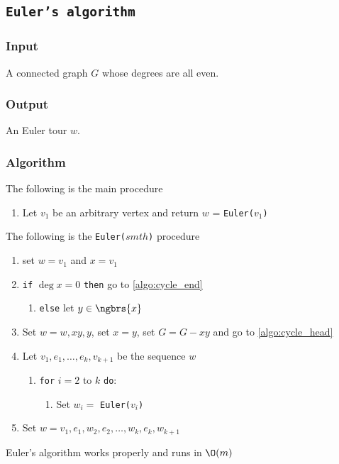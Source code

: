 \subsection{\texttt{Euler's algorithm}}
\subsubsection{Input}
    A connected graph $G$ whose degrees are all even.
\subsubsection{Output}
    An Euler tour $w$.
\subsubsection{Algorithm}
The following is the main procedure
\begin{enumerate}
    \item Let $v_1$ be an arbitrary vertex and return $w$ = \texttt{Euler($v_1$)}
\end{enumerate}
The following is the \texttt{Euler($smth$)} procedure
\begin{enumerate}
    \item set $w = v_1$ and $x = v_1$
    \item \label{algo:cycle_head} \texttt{if} $\deg{x} = 0$ \texttt{then} go to \ref{algo:cycle_end}
    \begin{enumerate}
        \item \texttt{else} let $y \in \ngbrs{x}$
    \end{enumerate}
    \item Set $w = w, xy, y$, set $x = y$, set $G = G - xy$ and go to \ref{algo:cycle_head}
    \item \label{algo:cycle_end} Let $v_1, e_1, \dots, e_k, v_{k + 1}$ be the sequence $w$
    \begin{enumerate}
        \item \texttt{for} $i = 2$ to $k$ \texttt{do}:
        \begin{enumerate}
            \item Set $w_i =$ \texttt{Euler($v_i$)}
        \end{enumerate}
    \end{enumerate}
    \item Set $w = v_1, e_1, w_2, e_2, \dots, w_k, e_k, w_{k + 1}$
\end{enumerate}
\begin{customtheorem}{1.29}
\label{theorem:1.29}
    Euler's algorithm works properly and runs in $\O(m)$
\end{customtheorem}
